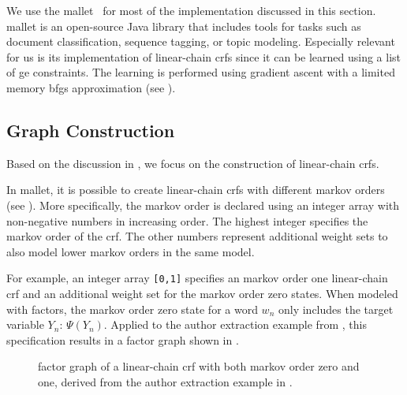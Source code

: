 We use the \acrfull{mallet}~\citep{mccallum2002mallet} for most of the implementation discussed in this section.
\gls{mallet} is an open-source Java library that includes tools for tasks such as document classification, sequence tagging, or topic modeling.
Especially relevant for us is its implementation of \glspl{linear-chain crf} since it can be learned using a list of \gls{ge} constraints.
The learning is performed using gradient ascent with a limited memory \gls{bfgs} approximation (see ).

\subsection{Graph Construction}\label{subsec:i-graph-construction}

Based on the discussion in , we focus on the construction of \glspl{linear-chain crf}.

In \gls{mallet}, it is possible to create \glspl{linear-chain crf} with different \glspl{markov order} (see ).
More specifically, the \gls{markov order} is declared using an integer array with non-negative numbers in increasing order.
The highest integer specifies the \gls{markov order} of the \gls{crf}.
The other numbers represent additional weight sets to also model lower \glspl{markov order} in the same model.

For example, an integer array \texttt{[0,1]} specifies an \gls{markov order} one \gls{linear-chain crf} and an additional weight set for the \gls{markov order} zero states.
When modeled with \glspl{factor}, the \gls{markov order} zero state for a word $w_n$ only includes the \gls{target variable} $Y_n$: $\Psi(Y_n)$.
Applied to the author extraction example from , this specification results in a \gls{factor graph} shown in .
\begin{figure}[t]
\centering

\caption{%
  \Gls{factor graph} of a \gls{linear-chain crf} with both \gls{markov order} zero and one, derived from the author extraction example in .}
\label{fig:example-linear-chain-crf-markov-order-0-1}
\end{figure}

